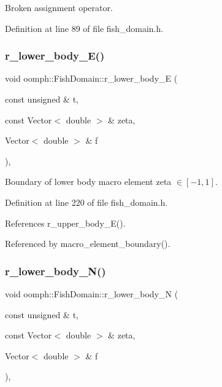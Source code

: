 Broken assignment operator. 



Definition at line 89 of file fish\+\_\+domain.\+h.

\mbox{\label{classoomph_1_1FishDomain_abb85a2acd9cf3cd8fae60fd9e487bd1c}} 
\subsubsection{\texorpdfstring{r\+\_\+lower\+\_\+body\+\_\+\+E()}{r\_lower\_body\_E()}}
{\footnotesize\ttfamily void oomph\+::\+Fish\+Domain\+::r\+\_\+lower\+\_\+body\+\_\+E (\begin{DoxyParamCaption}\item[{const unsigned \&}]{t,  }\item[{const Vector$<$ double $>$ \&}]{zeta,  }\item[{Vector$<$ double $>$ \&}]{f }\end{DoxyParamCaption})\hspace{0.3cm}{\ttfamily [inline]}, {\ttfamily [private]}}



Boundary of lower body macro element zeta $ \in [-1,1] $. 



Definition at line 220 of file fish\+\_\+domain.\+h.



References r\+\_\+upper\+\_\+body\+\_\+\+E().



Referenced by macro\+\_\+element\+\_\+boundary().

\mbox{\label{classoomph_1_1FishDomain_a75131ac72e23d5b1d701b588c0596b5d}} 
\subsubsection{\texorpdfstring{r\+\_\+lower\+\_\+body\+\_\+\+N()}{r\_lower\_body\_N()}}
{\footnotesize\ttfamily void oomph\+::\+Fish\+Domain\+::r\+\_\+lower\+\_\+body\+\_\+N (\begin{DoxyParamCaption}\item[{const unsigned \&}]{t,  }\item[{const Vector$<$ double $>$ \&}]{zeta,  }\item[{Vector$<$ double $>$ \&}]{f }\end{DoxyParamCaption})\hspace{0.3cm}{\ttfamily [inline]}, {\ttfamily [private]}}



